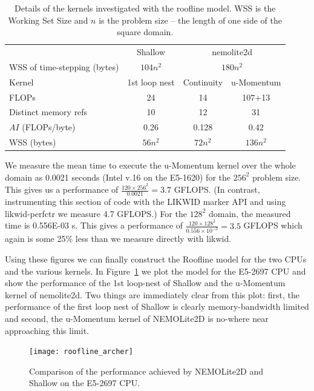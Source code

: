 \documentclass[12pt]{article}
\begin{document}
\begin{table}
\begin{tabular}{|l|c|c|c|}
\hline
                             & Shallow & \multicolumn{2}{c|}{nemolite2d} \\
WSS of time-stepping (bytes) & $104n^2$ & \multicolumn{2}{c|}{$180n^2$} \\ 
\hline
Kernel                     & 1st loop nest & Continuity & u-Momentum \\
\hline                                
FLOPs                      & 24      &    14      &   107+13   \\
Distinct memory refs       & 10      &    12      &   31       \\
$AI$ (FLOPs/byte)          & 0.26    &  0.128     &   0.42     \\
WSS (bytes)                & $56n^2$ &  $72n^2$   &   $136n^2$ \\
\hline
\end{tabular}
\caption{Details of the kernels investigated with the roofline
  model. WSS is the Working Set Size and $n$ is the problem size --
  the length of one side of the square domain.}
\label{TAB_kernel_details}
\end{table}

We measure the mean time to execute the u-Momentum kernel over the
whole domain as 0.0021 seconds (Intel v.16 on the E5-1620) for the
$256^2$ problem size. This gives us a performance of $\frac{120\times
  256^2}{0.0021} = 3.7$ GFLOPS. (In contrast, instrumenting this
section of code with the LIKWID marker API and using likwid-perfctr we
measure 4.7 GFLOPS.)  For the $128^2$ domain, the measured time is
0.556E-03 s. This gives a performance of $\frac{120\times
  128^2}{0.556\times10^{-3}} = 3.5$ GFLOPS which again is some 25\% less
than we measure directly with likwid.

Using these figures we can finally construct the Roofline model for
the two CPUs and the various kernels. In
Figure~\ref{FIG_roofline_archer} we plot the model for the E5-2697 CPU
and show the performance of the 1st loop-nest of Shallow and the
u-Momentum kernel of nemolite2d. Two things are immediately clear from
this plot: first, the performance of the first loop nest of Shallow is
clearly memory-bandwidth limited and second, the u-Momentum kernel of
NEMOLite2D is no-where near approaching this limit.

\begin{figure}
\centering
\texttt{[image: roofline\_archer]}
\caption{Comparison of the performance achieved by NEMOLite2D and
  Shallow on the E5-2697 CPU.}
\label{FIG_roofline_archer}
\end{figure}
\end{document}
